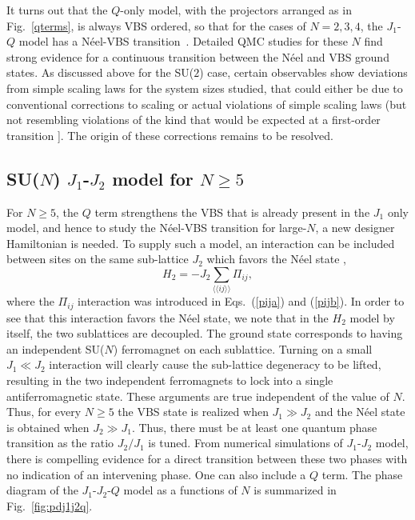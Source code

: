 \documentclass[range]{ar2e}
\begin{document}
It turns out that the $Q$-only model, with the projectors arranged as in Fig.~\ref{qterms}, is always VBS ordered, so that for the cases of $N=2,3,4$, 
the $J_1$-$Q$ model has a N\'eel-VBS transition~\cite{Sandvik07,lou2009:sun}. Detailed QMC studies for these $N$ find strong evidence for a 
continuous transition between the N\'eel and VBS ground states\cite{melko2008:jq,kaul2011:su34,banerjee2010:log,banerjee2010:su3}. 
As discussed above for the SU($2$) case, certain observables show deviations from simple scaling laws for the system sizes studied, that could either 
be due to conventional corrections to scaling or actual violations of simple scaling laws (but not resembling violations of the kind that would be 
expected at a first-order transition \cite{Sandvik10c}]. The origin of these corrections remains to be resolved.

\subsection{SU($N$) $J_1$-$J_2$ model for $N\geq 5$}
\label{ss:j1j2N}

For $N\geq 5$, the $Q$ term strengthens the VBS that is already present in the $J_1$ only model, and hence to study the N\'eel-VBS transition 
for large-$N$, a new designer Hamiltonian is needed. To supply such a model, an interaction can be included
between sites on the same sub-lattice $J_2$ which favors the N\'eel state \cite{kaul2011:j1j2},
\begin{equation}
H_{2}= -J_2 \sum_{\langle\langle ij\rangle\rangle} \Pi_{ij},
\end{equation}
where the $\Pi_{ij}$ interaction was introduced in Eqs.~(\ref{pija}) and (\ref{pijb}).
In order to see that this interaction favors the N\'eel state, we note that in the $H_{2}$ model by itself, the two sublattices 
are decoupled. The ground state corresponds to having an independent SU($N$) ferromagnet on each sublattice. Turning on a small $J_1\ll J_2$ 
interaction will clearly cause the sub-lattice degeneracy to be lifted, resulting in the two independent ferromagnets to lock into a single
antiferromagnetic state. These arguments are true independent of the value of $N$. Thus, for every $N\geq 5$ the VBS state is realized when 
$J_1\gg J_2$ and the N\'eel state is obtained when $J_2 \gg J_1$. Thus, there must be at least one quantum phase transition as the ratio
$J_2/J_1$ is tuned. From numerical simulations of $J_1$-$J_2$ model, there is compelling evidence for a direct transition between these two 
phases with no indication of an intervening phase. One can also include a $Q$ term. The phase diagram of the $J_1$-$J_2$-$Q$ model as a functions 
of $N$ is summarized in Fig.~\ref{fig:pdj1j2q}.
\end{document}
